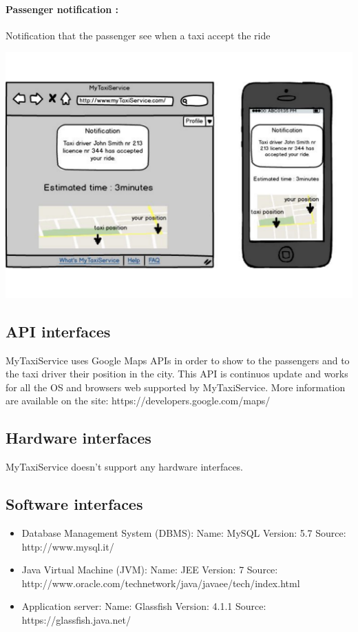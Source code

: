 \paragraph{Passenger notification :}
Notification that the passenger see when a taxi accept the ride
\begin{center}
	\includegraphics[width=\textwidth]{mockup/PassengerNotification.pdf}
\end{center}

\subsection{API interfaces}
MyTaxiService uses Google Maps APIs in order to show to the passengers and to the taxi driver their position in the city.
This API is continuos update and works for all the OS and browsers web supported by MyTaxiService.
More information are available on the site: https://developers.google.com/maps/

\subsection{Hardware interfaces}
MyTaxiService doesn't support any hardware interfaces.	\subsection{Software interfaces}
\begin{itemize}
	\item Database Management System (DBMS): \newline
	Name: MySQL \newline
	Version: 5.7 \newline
	Source: http://www.mysql.it/ 
	\item Java Virtual Machine (JVM):\newline
	Name: JEE \newline
	Version: 7 \newline
	Source: http://www.oracle.com/technetwork/java/javaee/tech/index.html
	\item Application server: \newline
	Name: Glassfish \newline
	Version: 4.1.1 \newline
	Source: https://glassfish.java.net/
\end{itemize}
